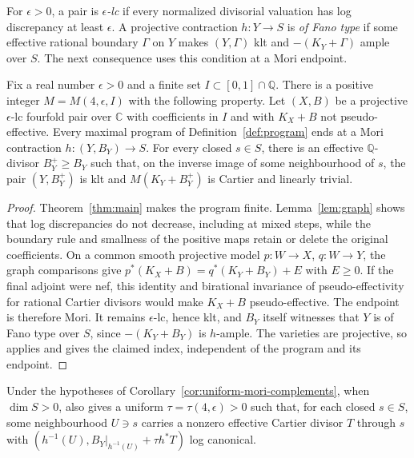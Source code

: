 For $\epsilon>0$, a pair is \emph{$\epsilon$-lc} if every normalized
divisorial valuation has log discrepancy at least $\epsilon$.
A projective contraction $h:Y\to S$ is \emph{of Fano type} if some
effective rational boundary $\Gamma$ on $Y$ makes $(Y,\Gamma)$ klt and
$-(K_Y+\Gamma)$ ample over $S$.  The next consequence uses this condition at a Mori
endpoint.

\begin{corollary}
\label{cor:uniform-mori-complements}
Fix a real number $\epsilon>0$ and a finite set $I\subset[0,1]\cap\mathbb Q$.
There is a positive integer $M=M(4,\epsilon,I)$ with the following
property. Let $(X,B)$ be a projective $\epsilon$-lc fourfold pair over
$\mathbb C$ with coefficients in $I$ and with $K_X+B$ not pseudo-effective.
Every maximal program of Definition~\ref{def:program} ends at a Mori
contraction $h:(Y,B_Y)\to S$. For every closed $s\in S$, there is an
effective $\mathbb Q$-divisor $B_Y^+\geq B_Y$ such that, on the inverse
image of some neighbourhood of $s$, the pair $(Y,B_Y^+)$ is klt and
$M(K_Y+B_Y^+)$ is Cartier and linearly trivial.
\end{corollary}
\begin{proof}
Theorem~\ref{thm:main} makes the program finite.
Lemma~\ref{lem:graph} shows that log discrepancies do not decrease,
including at mixed steps, while the boundary rule and smallness of the
positive maps retain or delete the original coefficients.
On a common smooth projective model $p:W\to X$, $q:W\to Y$, the graph
comparisons give
$p^*(K_X+B)=q^*(K_Y+B_Y)+E$ with $E\geq0$.
If the final adjoint were nef, this identity and birational invariance
of pseudo-effectivity for rational Cartier divisors would make
$K_X+B$ pseudo-effective. The endpoint is therefore Mori.
It remains $\epsilon$-lc, hence klt, and $B_Y$ itself witnesses that
$Y$ is of Fano type over $S$, since $-(K_Y+B_Y)$ is $h$-ample.
The varieties are projective, so
\cite[Corollary~1.2]{OpenAIComplements2026} applies and gives the claimed
index, independent of the program and its endpoint.
\end{proof}

Under the hypotheses of Corollary~\ref{cor:uniform-mori-complements},
when $\dim S>0$, \cite[Theorem~1]{OpenAICartier2026} also gives a uniform
$\tau=\tau(4,\epsilon)>0$ such that, for each closed $s\in S$, some
neighbourhood $U\ni s$ carries a nonzero effective Cartier divisor $T$
through $s$ with
$(h^{-1}(U),B_Y|_{h^{-1}(U)}+\tau h^*T)$ log canonical.

